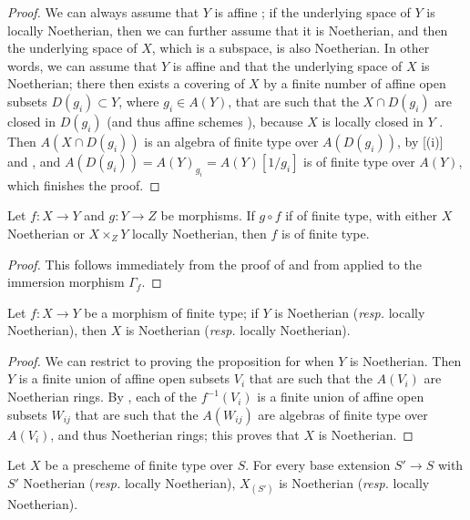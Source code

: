 \begin{proof}
\label{proof-1.6.3.5}
We can always assume that $Y$ is affine ;
if the underlying space of $Y$ is locally Noetherian, then we can further assume that it is Noetherian, and then the underlying space of $X$, which is a subspace, is also Noetherian.
In other words, we can assume that $Y$ is affine and that the underlying space of $X$ is Noetherian;
there then exists a covering of $X$ by a finite number of affine open subsets $D(g_i)\subset Y$, where $g_i\in A(Y)$, that are such that the $X\cap D(g_i)$ are closed in $D(g_i)$ (and thus affine schemes ), because $X$ is locally closed in $Y$ .
Then $A(X\cap D(g_i))$ is an algebra of finite type over $A(D(g_i))$, by [(i)] and , and $A(D(g_i))=A(Y)_{g_i}=A(Y)[1/g_i]$ is of finite type over $A(Y)$, which finishes the proof.
\end{proof}

\begin{cor}[6.3.6]
\label{1.6.3.6}
Let $f\colon X\to Y$ and $g\colon Y\to Z$ be morphisms.
If $g\circ f$ if of finite type, with either $X$ Noetherian or $X\times_Z Y$ locally Noetherian, then $f$ is of finite type.
\end{cor}

\begin{proof}
\label{proof-1.6.3.6}
This follows immediately from the proof of  and from  applied to the immersion morphism $\Gamma_f$.
\end{proof}

\begin{prop}[6.3.7]
\label{1.6.3.7}
Let $f\colon X\to Y$ be a morphism of finite type;
if $Y$ is Noetherian (\emph{resp.} locally Noetherian), then $X$ is Noetherian (\emph{resp.} locally Noetherian).
\end{prop}

\begin{proof}
\label{proof-1.6.3.7}
We can restrict to proving the proposition for when $Y$ is Noetherian.
Then $Y$ is a finite union of affine open subsets $V_i$ that are such that the $A(V_i)$ are Noetherian rings.
By , each of the $f^{-1}(V_i)$ is a finite union of affine open subsets $W_{ij}$ that are such that the $A(W_{ij})$ are algebras of finite type over $A(V_i)$, and thus Noetherian rings;
this proves that $X$ is Noetherian.
\end{proof}

\begin{cor}[6.3.8]
\label{1.6.3.8}
Let $X$ be a prescheme of finite type over $S$.
For every base extension $S'\to S$ with $S'$ Noetherian (\emph{resp.} locally Noetherian), $X_{(S')}$ is Noetherian (\emph{resp.} locally Noetherian).
\end{cor}

